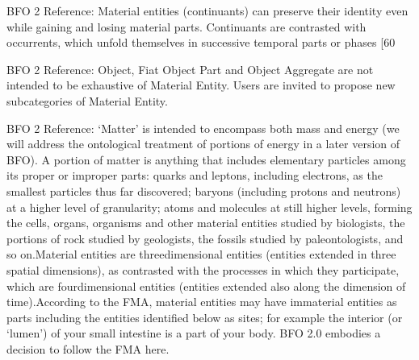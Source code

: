 \documentclass[letterpaper,10pt,english]{sphinxmanual}
\begin{document}
\begin{sphinxShadowBox}

\sphinxAtStartPar
BFO 2 Reference: Material entities (continuants) can preserve their identity even while gaining and losing material parts. Continuants are contrasted with occurrents, which unfold themselves in successive temporal parts or phases {[}60

\sphinxAtStartPar
BFO 2 Reference: Object, Fiat Object Part and Object Aggregate are not intended to be exhaustive of Material Entity. Users are invited to propose new subcategories of Material Entity.

\sphinxAtStartPar
BFO 2 Reference: ‘Matter’ is intended to encompass both mass and energy (we will address the ontological treatment of portions of energy in a later version of BFO). A portion of matter is anything that includes elementary particles among its proper or improper parts: quarks and leptons, including electrons, as the smallest particles thus far discovered; baryons (including protons and neutrons) at a higher level of granularity; atoms and molecules at still higher levels, forming the cells, organs, organisms and other material entities studied by biologists, the portions of rock studied by geologists, the fossils studied by paleontologists, and so on.Material entities are three\sphinxhyphen{}dimensional entities (entities extended in three spatial dimensions), as contrasted with the processes in which they participate, which are four\sphinxhyphen{}dimensional entities (entities extended also along the dimension of time).According to the FMA, material entities may have immaterial entities as parts \textendash{} including the entities identified below as sites; for example the interior (or ‘lumen’) of your small intestine is a part of your body. BFO 2.0 embodies a decision to follow the FMA here.
\end{sphinxShadowBox}

\begin{sphinxShadowBox}

\sphinxAtStartPar
{}
\end{sphinxShadowBox}
\begin{quote}
\label{\detokenize{doc-BFO_0000141:bfo-0000141}}\label{\detokenize{doc-BFO_0000141:immaterial-entity}}\label{\detokenize{doc-BFO_0000141:bfo-0000141}}
\ignorespaces \end{quote}
\end{document}

